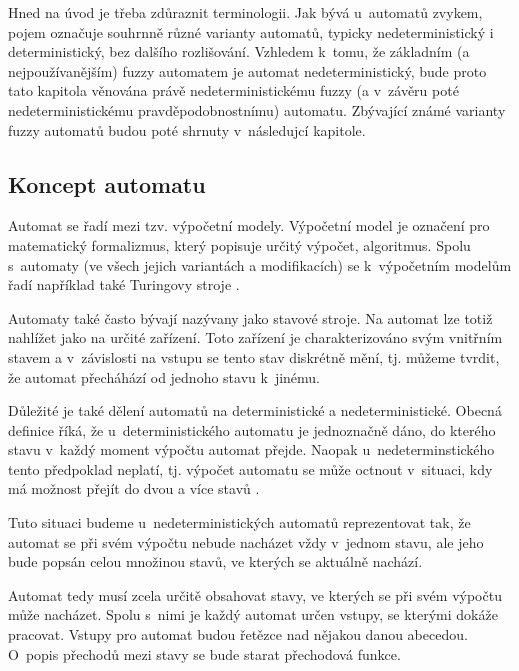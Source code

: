 Hned na úvod je třeba zdůraznit terminologii. Jak bývá u~automatů zvykem, pojem  označuje souhrnně různé varianty automatů, typicky nedeterministický i deterministický, bez dalšího rozlišování. Vzhledem k~tomu, že základním (a nejpoužívanějším) fuzzy automatem je automat nedeterministický, bude proto tato kapitola věnována právě nedeterministickému fuzzy (a v~závěru poté nedeterministickému pravděpodobnostnímu) automatu. Zbývající známé varianty fuzzy automatů budou poté shrnuty v~následujcí kapitole.


\subsection{Koncept automatu}
Automat se řadí mezi tzv. výpočetní modely. Výpočetní model je označení pro matematický formalizmus, který popisuje určitý výpočet, algoritmus. Spolu s~automaty (ve všech jejich variantách a modifikacích) se k~výpočetním modelům řadí například také Turingovy stroje \cite{MorMal-FuzzyAutLang}. 

Automaty také často bývají nazývany jako stavové stroje. Na automat lze totiž nahlížet jako na určité zařízení. Toto zařízení je charakterizováno svým vnitřním stavem a v~závislosti na vstupu se tento stav diskrétně mění, tj. můžeme tvrdit, že automat přecháhází od jednoho stavu k~jinému.

Důležité je také dělení automatů na deterministické a nedeterministické. Obecná definice říká, že u~deterministického automatu je jednoznačně dáno, do kterého stavu v~každý moment výpočtu automat přejde. Naopak u~nedeterminstického tento předpoklad neplatí, tj. výpočet automatu se může octnout v~situaci, kdy má možnost přejít do dvou a více stavů .

Tuto situaci budeme u~nedeterministických automatů reprezentovat tak, že automat se při svém výpočtu nebude nacházet vždy v~jednom stavu, ale jeho  bude popsán celou množinou stavů, ve kterých se aktuálně nachází.

Automat tedy musí zcela určitě obsahovat stavy, ve kterých se při svém výpočtu může nacházet. Spolu s~nimi je každý automat určen vstupy, se kterými dokáže pracovat. Vstupy pro automat budou řetězce nad nějakou danou abecedou. O~popis přechodů mezi stavy se bude starat přechodová funkce.

